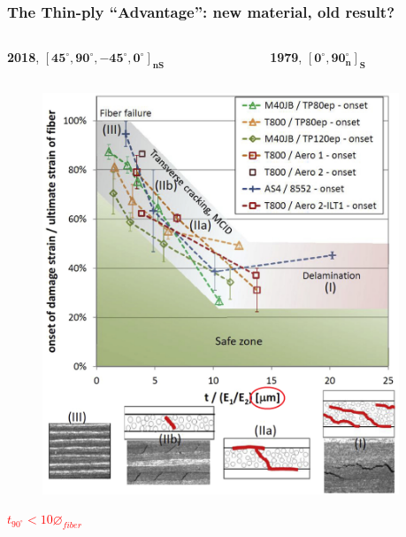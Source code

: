 \documentclass[first,firstsupp,lastsupp,last,hyperref,table]{ETHclass}
\begin{document}
\begin{frame}
\frametitle{\vspace{0.3cm}\small The Thin-ply ``Advantage'': new material, old result?}
\vspace{-0.8cm}
\centering
\begin{columns}[t]
\begin{column}{0.5\textwidth}
\centering
\tiny
\textbf{2018}, $\mathbf{\left[45^{\circ}, 90^{\circ},-45^{\circ},0^{\circ}\right]_{nS}}$
\end{column}
\begin{column}{0.5\textwidth}
\centering
\tiny
\textbf{1979}, $\mathbf{\left[0^{\circ}, 90^{\circ}_{n}\right]_{S}}$
\end{column}
\end{columns}
\vspace{-0.4cm}
\begin{columns}[c]
\begin{column}{0.5\textwidth}
\begin{figure}
\centering
\includegraphics[width=0.9\columnwidth]{thinply-plythicknesseffect-highlighted.png}
\end{figure}
\vspace{-0.6cm}
\centering
\textcolor{red}{\tiny$t_{90^{\circ}}<10\diameter_{fiber}$}
\end{column}
\begin{column}{0.5\textwidth}

\end{column}
\end{columns}
\end{frame}
\end{document}
